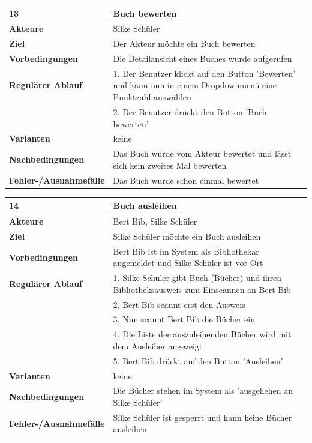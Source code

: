 \documentclass[fontsize=12pt,paper=a4,twoside]{scrartcl}
\begin{document}
\newpage

\begin{table}[htbp]
\label{13}
\begin{tabular}{|l|p{10cm}|}
\hline 
\textbf{13} & \textbf{Buch bewerten} \\ \hline
\textbf{Akteure} & Silke Schüler\\ \hline
\textbf{Ziel} & Der Akteur möchte ein Buch bewerten \\ \hline
\textbf{Vorbedingungen} & Die Detailansicht eines Buches wurde aufgerufen \\ \hline
\textbf{Regulärer Ablauf} & 
1. Der Benutzer klickt auf den Button 'Bewerten' und kann nun in einem Dropdownmenü eine Punktzahl 
auswählen\\
&2. Der Benutzer drückt den Button 'Buch bewerten'\\
\hline
\textbf{Varianten} & 
keine \\ \hline
\textbf{Nachbedingungen} & Das Buch wurde vom Akteur bewertet und lässt sich kein zweites Mal 
bewerten\\ \hline
\textbf{Fehler-/Ausnahmefälle} & Das Buch wurde schon einmal bewertet\\
\hline
\end{tabular}
\end{table}

\begin{table}[htbp]
\label{14}
\begin{tabular}{|l|p{10cm}|}
\hline 
\textbf{14} & \textbf{Buch ausleihen} \\ \hline
\textbf{Akteure} & Bert Bib, Silke Schüler\\ \hline
\textbf{Ziel} & Silke Schüler möchte ein Buch ausleihen \\ \hline
\textbf{Vorbedingungen} & Bert Bib ist im System als Bibliothekar angemeldet und Silke Schüler ist vor 
Ort \\ \hline
\textbf{Regulärer Ablauf} & 
1. Silke Schüler gibt Buch (Bücher) und ihren Bibliotheksausweis zum Einscannen an Bert Bib\\
&2. Bert Bib scannt erst den Ausweis\\
&3. Nun scannt Bert Bib die Bücher ein\\
&4. Die Liste der auszuleihenden Bücher wird mit dem Ausleiher angezeigt\\
&5. Bert Bib drückt auf den Button 'Ausleihen'\\
\hline
\textbf{Varianten} & 
keine \\ \hline
\textbf{Nachbedingungen} & Die Bücher stehen im System als 'ausgeliehen an Silke Schüler'\\ \hline
\textbf{Fehler-/Ausnahmefälle} & Silke Schüler ist gesperrt und kann keine Bücher ausleihen\\
\hline
\end{tabular}
\end{table}
\end{document}
